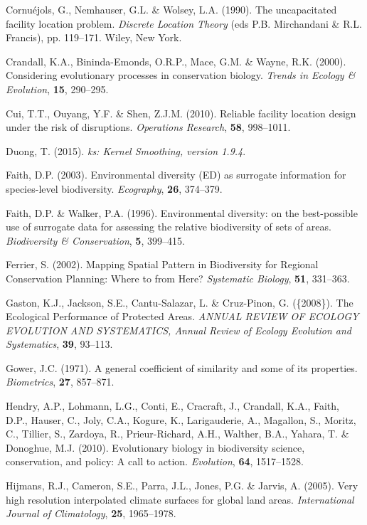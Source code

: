 \documentclass[11pt,]{article}
\begin{document}
Cornu{é}jols, G., Nemhauser, G.L. \& Wolsey, L.A. (1990). The
uncapacitated facility location problem. \emph{Discrete Location Theory}
(eds P.B. Mirchandani \& R.L. Francis), pp. 119--171. Wiley, New York.

Crandall, K.A., Bininda-Emonds, O.R.P., Mace, G.M. \& Wayne, R.K.
(2000). Considering evolutionary processes in conservation biology.
\emph{Trends in Ecology \& Evolution}, \textbf{15}, 290--295.

Cui, T.T., Ouyang, Y.F. \& Shen, Z.J.M. (2010). Reliable facility
location design under the risk of disruptions. \emph{Operations
Research}, \textbf{58}, 998--1011.

Duong, T. (2015). \emph{ks: Kernel Smoothing, version 1.9.4}.

Faith, D.P. (2003). Environmental diversity (ED) as surrogate
information for species-level biodiversity. \emph{Ecography},
\textbf{26}, 374--379.

Faith, D.P. \& Walker, P.A. (1996). Environmental diversity: on the
best-possible use of surrogate data for assessing the relative
biodiversity of sets of areas. \emph{Biodiversity \& Conservation},
\textbf{5}, 399--415.

Ferrier, S. (2002). Mapping Spatial Pattern in Biodiversity for Regional
Conservation Planning: Where to from Here? \emph{Systematic Biology},
\textbf{51}, 331--363.

Gaston, K.J., Jackson, S.E., Cantu-Salazar, L. \& Cruz-Pinon, G.
(\{2008\}). The Ecological Performance of Protected Areas. \emph{ANNUAL
REVIEW OF ECOLOGY EVOLUTION AND SYSTEMATICS, Annual Review of Ecology
Evolution and Systematics}, \textbf{39}, 93--113.

Gower, J.C. (1971). A general coefficient of similarity and some of its
properties. \emph{Biometrics}, \textbf{27}, 857--871.

Hendry, A.P., Lohmann, L.G., Conti, E., Cracraft, J., Crandall, K.A.,
Faith, D.P., Hauser, C., Joly, C.A., Kogure, K., Larigauderie, A.,
Magallon, S., Moritz, C., Tillier, S., Zardoya, R., Prieur-Richard,
A.H., Walther, B.A., Yahara, T. \& Donoghue, M.J. (2010). Evolutionary
biology in biodiversity science, conservation, and policy: A call to
action. \emph{Evolution}, \textbf{64}, 1517--1528.

Hijmans, R.J., Cameron, S.E., Parra, J.L., Jones, P.G. \& Jarvis, A.
(2005). Very high resolution interpolated climate surfaces for global
land areas. \emph{International Journal of Climatology}, \textbf{25},
1965--1978.
\end{document}
